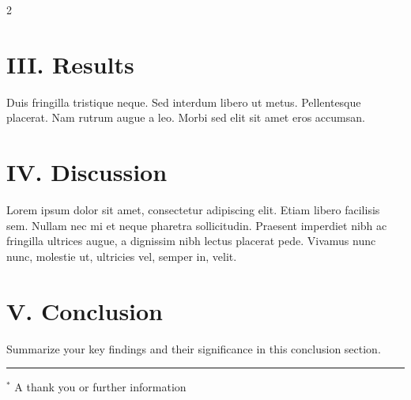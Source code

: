 \documentclass[12pt]{article}
\begin{document}
\begin{multicols}{2}
\section*{III. \quad Results}

Duis fringilla tristique neque. Sed interdum libero ut metus. Pellentesque placerat. Nam rutrum augue a leo. Morbi sed elit sit amet eros accumsan.

\section*{IV. \quad Discussion}

Lorem ipsum dolor sit amet, consectetur adipiscing elit. Etiam libero facilisis sem. Nullam nec mi et neque pharetra sollicitudin. Praesent imperdiet nibh ac fringilla ultrices augue, a dignissim nibh lectus placerat pede. Vivamus nunc nunc, molestie ut, ultricies vel, semper in, velit.

\section*{V. \quad Conclusion}

Summarize your key findings and their significance in this conclusion section.

\vspace{0.2in}
\begin{center}
\hrule
\end{center}

\noindent$^*$ A thank you or further information

\end{multicols}
\end{document}
